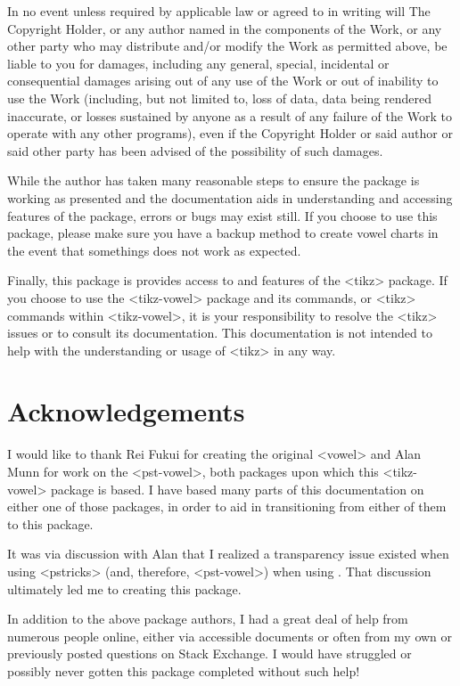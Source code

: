 \documentclass{article}
\newcommand{\ignore}[1]{}
\newcommand{\pkg}[1]{\texttt{#1}}
\def\texttt#1{<#1>}%
\begin{document}
In no event unless required by applicable law or agreed to in writing will The Copyright Holder, or any author named in the components of the Work, or any other party who may distribute and/or modify the Work as permitted above, be liable to you for damages, including any general, special, incidental or consequential damages arising out of any use of the Work or out of inability to use the Work (including, but not limited to, loss of data, data being rendered inaccurate, or losses sustained by anyone as a result of any failure of the Work to operate with any other programs), even if the Copyright Holder or said author or said other party has been advised of the possibility of such damages.

While the author has taken many reasonable steps to ensure the package is working as presented and the documentation aids in understanding and accessing features of the package, errors or bugs may exist still.  If you choose to use this package, please make sure you have a backup method to create vowel charts in the event that somethings does not work as expected.

Finally, this package is provides access to and features of the \pkg{tikz} package.  If you choose to use the \pkg{tikz-vowel} package and its commands, or \pkg{tikz} commands within \pkg{tikz-vowel}, it is your responsibility to resolve the \pkg{tikz} issues or to consult its documentation.  This documentation is not intended to help with the understanding or usage of \pkg{tikz} in any way.


\section{Acknowledgements}
\label{sec:Acknowledgements}
I would like to thank Rei Fukui for creating the original \pkg{vowel} and Alan Munn for work on the \pkg{pst-vowel}, both packages upon which this \pkg{tikz-vowel} package is based.  I have based many parts of this documentation on either one of those packages, in order to aid in transitioning from either of them to this package.

It was via discussion with Alan that I realized a transparency issue existed when using \pkg{pstricks} (and, therefore, \pkg{pst-vowel}) when using \XeLaTeX.  That discussion ultimately led me to creating this package.

In addition to the above package authors, I had a great deal of help from numerous people online, either via accessible documents or often from my own or previously posted questions on Stack Exchange.  I would have struggled or possibly never gotten this package completed without such help!



\ignore{
			\cardinalvowel{i}{1}
			\cardinalvowel{e}{2}
    			\cardinalvowel{ɛ}{3}
    			\cardinalvowel{a}{4}
    			\cardinalvowel{ɑ}{5}
    			\cardinalvowel{ɔ}{6}
    			\cardinalvowel{o}{7}
    			\cardinalvowel{u}{8}
    			\cardinalvowel{ɨ}{9}
    			\cardinalvowel{ɘ}{10}
   			\cardinalvowel{ə}{11}
   			\cardinalvowel{ɜ}{12}
    			\cardinalvowel{ɪ}{13}
    			\cardinalvowel{ʊ}{14}
    			\cardinalvowel{ɐ}{15}
    			\cardinalvowel{æ}{16}
}%
\end{document}
